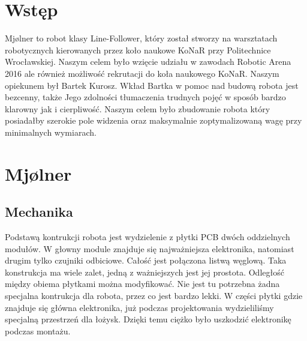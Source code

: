\documentclass[12pt,a4paper]{article}
\begin{document}
\maketitle %
\tableofcontents %
\newpage %


\section{Wstęp}

Mjølner to robot klasy Line-Follower, który został stworzy na warsztatach robotycznych kierowanych przez koło naukowe KoNaR przy Politechnice Wrocławskiej. Naszym celem było wzięcie udziału w zawodach Robotic Arena 2016 ale również możliwość rekrutacji do koła naukowego KoNaR. Naszym opiekunem był Bartek Kurosz. Wkład Bartka w pomoc nad budową robota jest bezcenny, także Jego zdolności tłumaczenia trudnych pojęć w sposób bardzo klarowny jak i cierpliwość. Naszym celem było zbudowanie robota który posiadałby szerokie pole widzenia oraz maksymalnie zoptymalizowaną wagę przy minimalnych wymiarach. 

\section{Mjølner}

\subsection{Mechanika}

Podstawą kontrukcji robota jest wydzielenie z płytki PCB dwóch oddzielnych modułów. W głowny module znajduje się najważniejsza elektronika, natomiast drugim tylko czujniki odbiciowe. Całość jest połączona listwą węglową. Taka konstrukcja ma wiele zalet, jedną z ważniejszych jest jej prostota. Odległość między obiema płytkami można modyfikować. Nie jest tu potrzebna żadna specjalna kontrukcja dla robota, przez co jest bardzo lekki. W części płytki gdzie znajduje się główna elektronika, już podczas projektowania wydzieliliśmy specjalną przestrzeń dla łożysk. Dzięki temu ciężko było uszkodzić elektronikę podczas montażu.
\end{document}
